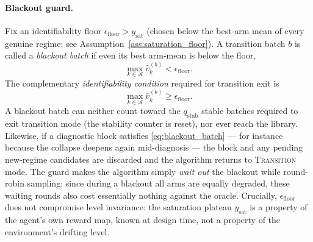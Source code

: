 \documentclass[11pt]{article}
\newcommand{\A}{\mathcal A}
\begin{document}
\paragraph{Blackout guard.}
Fix an identifiability floor $\epsilon_{\mathrm{floor}}>y_{\mathrm{sat}}$ (chosen below the best-arm mean of every genuine regime; see Assumption~\ref{ass:saturation_floor}). A transition batch $b$ is called a \emph{blackout batch} if even its best arm-mean is below the floor,
\begin{equation}
\label{eq:blackout_batch}
\max_{k\in\A}\widehat v_k^{(b)}
<
\epsilon_{\mathrm{floor}}.
\end{equation}
The complementary \emph{identifiability condition} required for transition exit is
\begin{equation}
\label{eq:identifiability_condition}
\max_{k\in\A}\widehat v_k^{(b)}
\geq
\epsilon_{\mathrm{floor}}.
\end{equation}
A blackout batch can neither count toward the $q_{\mathrm{stab}}$ stable batches required to exit transition mode (the stability counter is reset), nor ever reach the library. Likewise, if a diagnostic block satisfies \eqref{eq:blackout_batch} --- for instance because the collapse deepens again mid-diagnosis --- the block and any pending new-regime candidates are discarded and the algorithm returns to \textsc{Transition} mode. The guard makes the algorithm simply \emph{wait out} the blackout while round-robin sampling; since during a blackout all arms are equally degraded, these waiting rounds also cost essentially nothing against the oracle. Crucially, $\epsilon_{\mathrm{floor}}$ does not compromise level invariance: the saturation plateau $y_{\mathrm{sat}}$ is a property of the agent's own reward map, known at design time, not a property of the environment's drifting level.
\end{document}

